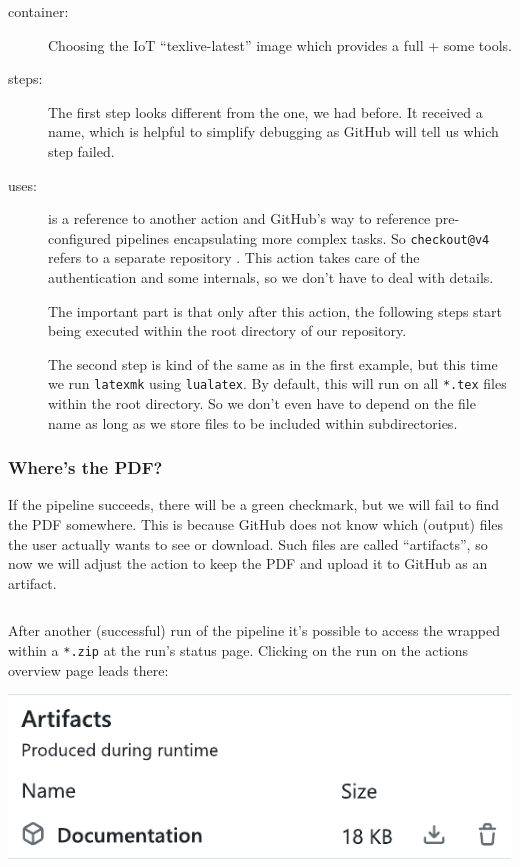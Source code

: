\documentclass[final]{ltugboat}
\newcommand*{\TeXLive}{\acro{\TeX\,Live}\xspace}
\newcommand*{\action}[1]{\texttt{#1}}
\newcommand*{\command}[1]{\texttt{#1}}
\newcommand*{\file}[1]{\texttt{#1}}
\newcommand*{\containerimage}[1]{\enquote{#1}}
\begin{document}
\begin{description}
\item[container:] Choosing the IoT \containerimage{texlive-latest} image which provides a full \TeXLive + some tools\cite{islandoftex-docker}.
\item[steps:]
The first step looks different from the one, we had before.
It received a name, which is helpful to simplify debugging as GitHub will tell us which step failed.

\item[uses:] is a reference to another action and GitHub's way to reference pre-configured pipelines encapsulating more complex tasks.
So \action{checkout@v4} refers to a separate repository \cite{github-action-checkout}.
This action takes care of the authentication and some internals, so we don't have to deal with details.

The important part is that only after this action, the following steps start being executed within the root directory of our repository.

The second step is kind of the same as in the first example, but this time we run \command{latexmk}\cite{latexmk} using \command{lualatex}.
By default, this will run on all \file{*.tex} files within the root directory.
So we don't even have to depend on the file name as long as we store files to be included within subdirectories.
\end{description}

\subsubsection{Where's the PDF?}
If the pipeline succeeds, there will be a green checkmark, but we will fail to find the PDF somewhere.
This is because GitHub does not know which (output) files the user actually wants to see or download.
Such files are called \enquote{artifacts}, so now we will adjust the action to keep the PDF and upload it to GitHub as an artifact.

\inputminted[firstline=13, lastline=17,gobble=3]{yaml}{examples/latex-basic.yml}

After another (successful) run of the pipeline it's possible to access the  wrapped within a  \file{*.zip} at the run's status page.
Clicking on the run on the actions overview page leads there:

\noindent\includegraphics[width=\linewidth,alt={Cropping of a screenshot. It shows the GitHub artifacts download section. A Packaged artifact called “Documentation” is available.}]{screenshot-artifacts}
\end{document}
